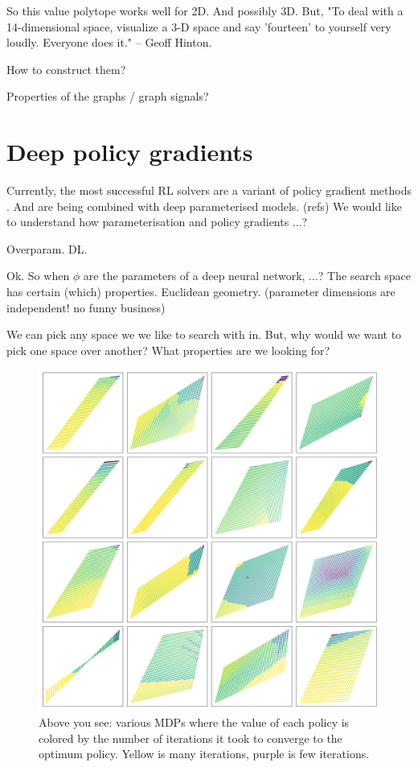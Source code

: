 So this value polytope works well for 2D. And possibly 3D. But,
"To deal with a 14-dimensional space, visualize a 3-D space and say 'fourteen' to yourself very loudly. Everyone does it." -- Geoff Hinton.

How to construct them?

Properties of the graphs / graph signals?



\section{Deep policy gradients}\label{ss-extras}

Currently, the most successful RL solvers are a variant of policy gradient methods \cite{Mnih2016,Schulmanb}.
And are being combined with deep parameterised models. (refs)
We would like to understand how parameterisation and policy gradients ...?


Overparam. DL. \cite{Arora2018}

Ok. So when $\phi$ are the parameters of a deep neural network, ...? The search space has certain (which) properties.
Euclidean geometry.
(parameter dimensions are independent! no funny business)

We can pick any space we we like to search with in. But, why would we want to pick one space over another?
What properties are we looking for?

\begin{figure}
\centering
\includegraphics[width=1\textwidth,height=1\textheight]{../../pictures/figures/mvi-iterations.png}
\caption{Above you see: various MDPs where the value of each policy is colored
by the number of iterations it took to converge to the optimum policy. Yellow is many iterations, purple is few iterations.}
\end{figure}

